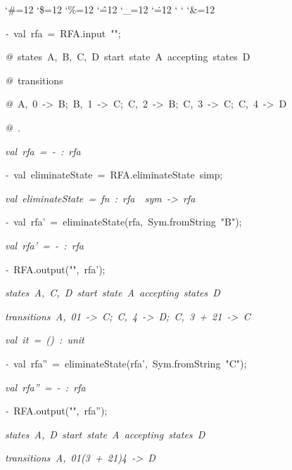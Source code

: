 \begin{list}{}
{\setlength{\leftmargin}{\leftmargini}
\setlength{\rightmargin}{0cm}
\setlength{\itemindent}{0cm}
\setlength{\listparindent}{0cm}
\setlength{\itemsep}{0cm}
\setlength{\parsep}{0cm}
\setlength{\labelsep}{0cm}
\setlength{\labelwidth}{0cm}
\catcode`\#=12
\catcode`\$=12
\catcode`\%=12
\catcode`\^=12
\catcode`\_=12
\catcode`\.=12
\catcode`
\catcode`
\catcode`\&=12
\ttfamily}
\small
\item[]\textsl{-\ }val\ rfa\ =\ RFA.input\ "";
\item[]\textsl{@\ }states\ A,\ B,\ C,\ D\ start\ state\ A\ accepting\ states\ D
\item[]\textsl{@\ }transitions
\item[]\textsl{@\ }A,\ 0\ ->\ B;\ B,\ 1\ ->\ C;\ C,\ 2\ ->\ B;\ C,\ 3\ ->\ C;\ C,\ 4\ ->\ D
\item[]\textsl{@\ }.
\item[]\textsl{val\ rfa\ =\ -\ :\ rfa}
\item[]\textsl{-\ }val\ eliminateState\ =\ RFA.eliminateState\ simp;
\item[]\textsl{val\ eliminateState\ =\ fn\ :\ rfa\ \ sym\ ->\ rfa}
\item[]\textsl{-\ }val\ rfa'\ =\ eliminateState(rfa,\ Sym.fromString\ "B");
\item[]\textsl{val\ rfa'\ =\ -\ :\ rfa}
\item[]\textsl{-\ }RFA.output("",\ rfa');
\item[]\textsl{states\ A,\ C,\ D\ start\ state\ A\ accepting\ states\ D}
\item[]\textsl{transitions\ A,\ 01\ ->\ C;\ C,\ 4\ ->\ D;\ C,\ 3\ +\ 21\ ->\ C}
\item[]\textsl{val\ it\ =\ ()\ :\ unit}
\item[]\textsl{-\ }val\ rfa''\ =\ eliminateState(rfa',\ Sym.fromString\ "C");
\item[]\textsl{val\ rfa''\ =\ -\ :\ rfa}
\item[]\textsl{-\ }RFA.output("",\ rfa'');
\item[]\textsl{states\ A,\ D\ start\ state\ A\ accepting\ states\ D}
\item[]\textsl{transitions\ A,\ 01(3\ +\ 21)4\ ->\ D}

\end{list}
